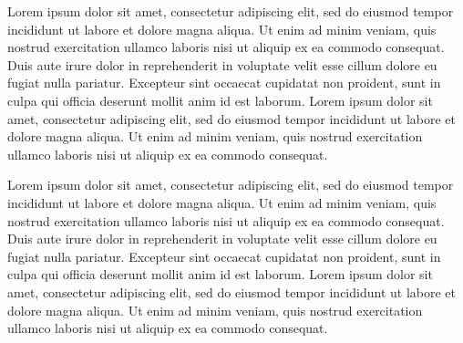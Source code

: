 \documentclass[letterpaper, 10 pt, conference]{ieeeconf}  %
\begin{document}
Lorem ipsum dolor sit amet, consectetur adipiscing elit, sed do eiusmod tempor incididunt ut labore et dolore magna aliqua. Ut enim ad minim veniam, quis nostrud exercitation ullamco laboris nisi ut aliquip ex ea commodo consequat. Duis aute irure dolor in reprehenderit in voluptate velit esse cillum dolore eu fugiat nulla pariatur. Excepteur sint occaecat cupidatat non proident, sunt in culpa qui officia deserunt mollit anim id est laborum. Lorem ipsum dolor sit amet, consectetur adipiscing elit, sed do eiusmod tempor incididunt ut labore et dolore magna aliqua. Ut enim ad minim veniam, quis nostrud exercitation ullamco laboris nisi ut aliquip ex ea commodo consequat. 

Lorem ipsum dolor sit amet, consectetur adipiscing elit, sed do eiusmod tempor incididunt ut labore et dolore magna aliqua. Ut enim ad minim veniam, quis nostrud exercitation ullamco laboris nisi ut aliquip ex ea commodo consequat. Duis aute irure dolor in reprehenderit in voluptate velit esse cillum dolore eu fugiat nulla pariatur. Excepteur sint occaecat cupidatat non proident, sunt in culpa qui officia deserunt mollit anim id est laborum. Lorem ipsum dolor sit amet, consectetur adipiscing elit, sed do eiusmod tempor incididunt ut labore et dolore magna aliqua. Ut enim ad minim veniam, quis nostrud exercitation ullamco laboris nisi ut aliquip ex ea commodo consequat. 

\end{document}
